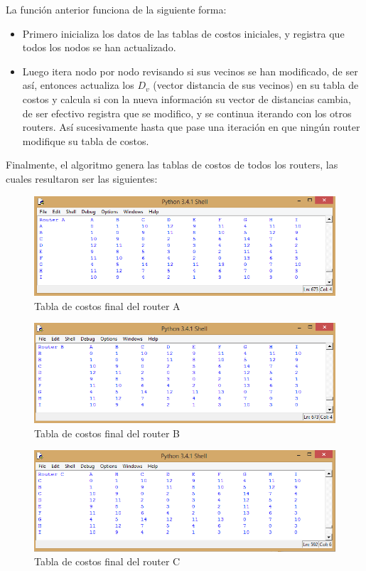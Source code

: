 \documentclass{article}
\begin{document}
La función anterior funciona de la siguiente forma:

\begin{itemize}

\item Primero inicializa los datos de las tablas de costos iniciales, y registra que todos los nodos se han actualizado.
\item Luego itera nodo por nodo revisando si sus vecinos se han modificado, de ser así, entonces actualiza los $D_v$ (vector distancia de sus vecinos) en su tabla de costos y calcula si con la nueva información su vector de distancias cambia, de ser efectivo registra que se modifico, y se continua iterando con los otros routers. Así sucesivamente hasta que pase una iteración en que ningún router modifique su tabla de costos.
\end{itemize}

Finalmente, el algoritmo genera las tablas de costos de todos los routers, las cuales resultaron ser las siguientes:

\begin{figure}[H]
\centering
\includegraphics[width=\textwidth]{p21.png}
\caption{Tabla de costos final del router A}
\label{fig:Tabla de costos}
\end{figure} 

\begin{figure}[H]
\centering
\includegraphics[width=\textwidth]{p22.png}
\caption{Tabla de costos final del router B}
\label{fig:Tabla de costos}
\end{figure}

\begin{figure}[H]
\centering
\includegraphics[width=\textwidth]{p23.png}
\caption{Tabla de costos final del router C}
\label{fig:Tabla de costos}
\end{figure}
\end{document}

